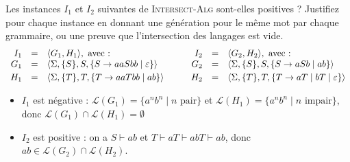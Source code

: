 \begin{exercice}
  \begin{questions}
  \item Les instances $I_1$ et $I_2$ suivantes de \textsc{Intersect-Alg} sont-elles positives ?
    Justifiez pour chaque instance en donnant une génération pour le même mot par chaque grammaire, ou une preuve que l'intersection des langages est vide.
    $$\begin{array}{rcl}
      I_1 &=& \langle G_1, H_1 \rangle, \text{ avec :}\\
      
      G_1 &=&  \left\langle \Sigma, \{S\}, S, \left\{S \rightarrow aaSbb \mid \varepsilon\right\} \right\rangle \vspace{1mm}\\

      H_1 &=&  \left\langle \Sigma, \{T\}, T, \left\{T \rightarrow aaTbb \mid ab\right\} \right\rangle\\
    \end{array}
    \quad\quad
    \begin{array}{rcl}
      I_2 &=& \langle G_2, H_2 \rangle, \text{ avec :}\\
      
      G_2 &=&  \left\langle \Sigma, \{S\}, S, \left\{S \rightarrow aSb \mid ab\right\} \right\rangle \vspace{1mm}\\

      H_2 &=&  \left\langle \Sigma, \{T\}, T, \left\{T \rightarrow aT \mid bT \mid \varepsilon\right\} \right\rangle\\
    \end{array}$$
  \end{questions}
  \begin{corrections}
    \begin{itemize}
    \item $I_1$ est négative : $\mathcal{L}(G_1) = \{a^n b^n \mid n \text{ pair} \}$ et $\mathcal{L}(H_1) = \{a^n b^n \mid n \text{ impair} \}$, donc $\mathcal{L}(G_1) \cap \mathcal{L}(H_1) = \emptyset$
    \item $I_2$ est positive : on a $S \vdash ab$ et $T \vdash aT \vdash abT \vdash ab$, donc $ab \in \mathcal{L}(G_2) \cap \mathcal{L}(H_2)$.
    \end{itemize}
  \end{corrections}


\end{exercice}
